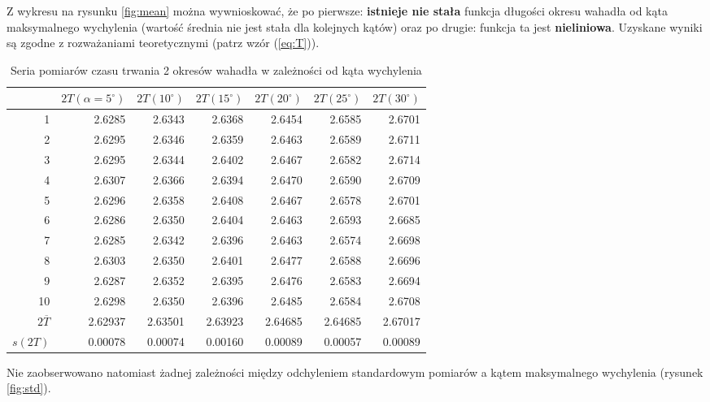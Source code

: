 \documentclass[a4paper]{article}
\begin{document}
Z wykresu na rysunku \ref{fig:mean} można wywnioskować, że po pierwsze: \textbf{istnieje nie stała} funkcja długości okresu wahadła od kąta maksymalnego wychylenia (wartość średnia nie jest stała dla kolejnych kątów) oraz po drugie: funkcja ta jest \textbf{nieliniowa}. 
Uzyskane wyniki są zgodne z rozważaniami teoretycznymi (patrz wzór (\ref{eq:T})).


\begin{table}[h!]
\centering
	\begin{tabular}{rrrrrrr}
	\toprule
	{} &$2T(\alpha=5^\circ)$ &$2T(10^\circ)$ &$2T(15^\circ)$ &$2T(20^\circ)$ &$2T(25^\circ)$ &$2T(30^\circ)$ \\
	\midrule
	1 &  2.6285 &  2.6343 &  2.6368 &  2.6454 &  2.6585 &  2.6701 \\
	2 &  2.6295 &  2.6346 &  2.6359 &  2.6463 &  2.6589 &  2.6711 \\
	3 &  2.6295 &  2.6344 &  2.6402 &  2.6467 &  2.6582 &  2.6714 \\
	4 &  2.6307 &  2.6366 &  2.6394 &  2.6470 &  2.6590 &  2.6709 \\
	5 &  2.6296 &  2.6358 &  2.6408 &  2.6467 &  2.6578 &  2.6701 \\
	6 &  2.6286 &  2.6350 &  2.6404 &  2.6463 &  2.6593 &  2.6685 \\
	7 &  2.6285 &  2.6342 &  2.6396 &  2.6463 &  2.6574 &  2.6698 \\
	8 &  2.6303 &  2.6350 &  2.6401 &  2.6477 &  2.6588 &  2.6696 \\
	9 &  2.6287 &  2.6352 &  2.6395 &  2.6476 &  2.6583 &  2.6694 \\
	10 &  2.6298 &  2.6350 &  2.6396 &  2.6485 &  2.6584 &  2.6708 \\
	\midrule
	$2\overline{T}$& 2.62937 & 2.63501 & 2.63923 & 2.64685 & 2.64685 & 2.67017 \\ 
	$s(2T)$ & 0.00078 & 0.00074 & 0.00160 & 0.00089 & 0.00057 & 0.00089 \\
	\bottomrule
\end{tabular}
\caption{Seria pomiarów czasu trwania 2 okresów wahadła w zależności od kąta wychylenia}
\label{pomiary_1}
\end{table}


Nie zaobserwowano natomiast żadnej zależności między odchyleniem standardowym pomiarów 
a kątem maksymalnego wychylenia (rysunek \ref{fig:std}).
\end{document}

